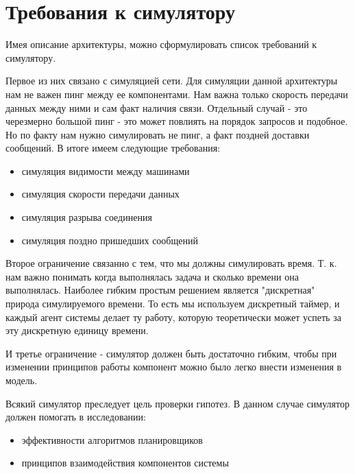 \section{Требования к симулятору}

Имея описание архитектуры, можно сформулировать список требований к симулятору.

Первое из них связано с симуляцией сети. Для симуляции данной архитектуры нам не важен пинг между ее компонентами. Нам важна только скорость передачи данных между ними и сам факт наличия связи. Отдельный случай - это черезмерно большой пинг - это может повлиять на порядок запросов и подобное. Но по факту нам нужно симулировать не пинг, а факт поздней доставки сообщений. В итоге имеем следующие требования:

\begin{itemize}
	\item симуляция видимости между машинами
	\item симуляция скорости передачи данных
	\item симуляция разрыва соединения
	\item симуляция поздно пришедших сообщений
\end{itemize}

Второе ограничение связанно с тем, что мы должны симулировать время. Т. к. нам важно понимать когда выполнялась задача и сколько времени она выполнялась. Наиболее гибким простым решением является "дискретная" природа симулируемого времени. То есть мы используем дискретный таймер, и каждый агент системы делает ту работу, которую теоретически может успеть за эту дискретную единицу времени.

И третье ограничение - симулятор должен быть достаточно гибким, чтобы при изменении принципов работы компонент можно было легко внести изменения в модель.

Всякий симулятор преследует цель проверки гипотез. В данном случае симулятор должен помогать в исследовании:

\begin{itemize}
	\item эффективности алгоритмов планировщиков
	\item принципов взаимодействия компонентов системы
\end{itemize}